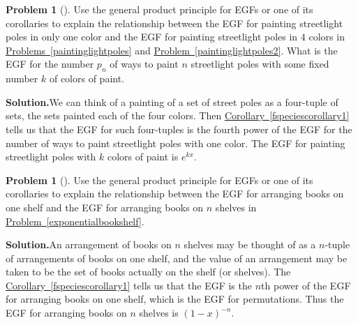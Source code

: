 \documentclass[10pt,]{book}
\theoremstyle{plain}
\theoremstyle{definition}
\newtheorem{activity}[project]{Problem}
\theoremstyle{definition}
\numberwithin{equation}{chapter}
\begin{document}
\begin{activity}[]\label{activity-401}
Use the general product principle for EGFs or one of its corollaries to explain the relationship between the EGF for painting streetlight poles in only one color and the EGF for painting streetlight poles in \(4\) colors in \hyperref[paintinglightpoles]{Problems~\ref{paintinglightpoles}} and \hyperref[paintinglightpoles2]{Problem~\ref{paintinglightpoles2}}. What is the EGF for the number \(p_n\) of ways to paint \(n\) streetlight poles with some fixed number \(k\) of colors of paint.%
\par\medskip\noindent%
\textbf{Solution.}\quad We can think of a painting of a set of street poles as a four-tuple of sets, the sets painted each of the four colors. Then \hyperref[fspeciescorollary1]{Corollary~\ref{fspeciescorollary1}} tells us that the EGF for such four-tuples is the fourth power of the EGF for the number of ways to paint streetlight poles with one color. The EGF for painting streetlight poles with \(k\) colors of paint is \(e^{kx}\).%
\end{activity}
\begin{activity}[]\label{activity-402}
Use the general product principle for EGFs or one of its corollaries to explain the relationship between the EGF for arranging books on one shelf and the EGF for arranging books on \(n\) shelves in \hyperref[exponentialbookshelf]{Problem~\ref{exponentialbookshelf}}.%
\par\medskip\noindent%
\textbf{Solution.}\quad An arrangement of books on \(n\) shelves may be thought of as a \(n\)-tuple of arrangements of books on one shelf, and the value of an arrangement may be taken to be the set of books actually on the shelf (or shelves). The \hyperref[fspeciescorollary1]{Corollary~\ref{fspeciescorollary1}} tells us that the EGF is the \(n\)th power of the EGF for arranging books on one shelf, which is the EGF for permutations. Thus the EGF for arranging books on \(n\) shelves is \((1-x)^{-n}\).%
\end{activity}
\end{document}
